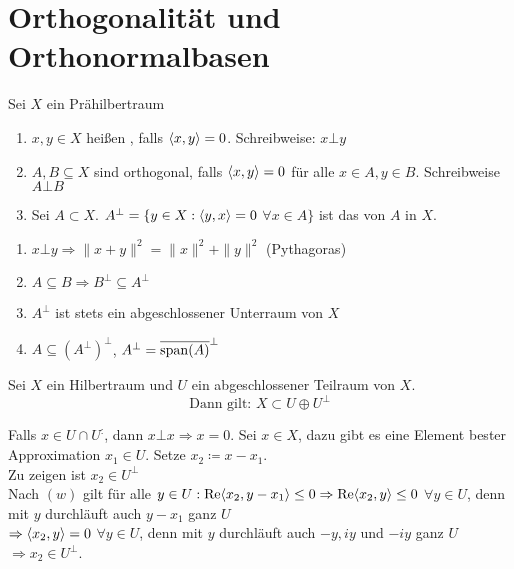 


\section{Orthogonalität und Orthonormalbasen}


\begin{definition}
	Sei $X$ ein Prähilbertraum
	\begin{enumerate}[label=\alph*\upshape)]
		\item $x, y \in X$ hei{\ss}en , falls $\langle x, y \rangle = 0$. Schreibweise: $x \bot y$
		\item $A, B \subseteq X$ sind orthogonal, falls $\langle x, y \rangle = 0$ für alle $x \in A, y \in B$. Schreibweise $A \bot B$
		\item Sei $A \subset X$. $A^{\bot} = \{ y \in X: \langle y, x \rangle = 0$ $\forall x \in A \}$ ist das  von $A$ in $X$.
	\end{enumerate}
\end{definition}


\begin{bemerkung}
	\begin{enumerate}[label=\alph*\upshape)]
		\item $x \bot y \Rightarrow \| x + y \|^{2} = \| x \|^{2} + \| y \|^{2} $ (Pythagoras) 
		\item $A \subseteq B \Rightarrow B^{\bot} \subseteq A^{\bot}$
		\item $A^{\bot}$ ist stets ein abgeschlossener Unterraum von $X$
		\item $A \subseteq \left( A^{\bot} \right)^{\bot}$, $A^{\bot} = \overline{ \operatorname{span}(A) }^{\bot}$
	\end{enumerate}	
\end{bemerkung}


\begin{satz}[Orthogonalzerlegung]  \label{satz:13.6-Orthogonalzerlegung}
	Sei $X$ ein Hilbertraum und $U$ ein abgeschlossener Teilraum von $X$.
		\[ \text{Dann gilt: } X \subset U \oplus U^{\bot} \]
\end{satz}

\begin{beweis}
	Falls $x \in U \cap U^{\colon}$, dann $x \bot x \Rightarrow x = 0$. Sei $x \in X$, dazu gibt es eine Element bester Approximation $x_{1} \in U$. Setze $x_{2} \coloneqq x - x_{1}$. \\
	Zu zeigen ist $x_{2} \in U^{\bot}$ \\
	Nach \hyperref[eq:15.7.5-SkalarproductbestApproximation]{$(w)$} gilt für alle $y \in U: \mathop{\rm Re}\nolimits \langle x_{2}, y - x_{1} \rangle \leq 0 \Rightarrow \mathop{\rm Re}\nolimits \langle x_{2}, y \rangle \leq 0$ $\forall y \in U$, denn mit $y$ durchläuft auch $y - x_{1}$ ganz $U$ \\
	$\Rightarrow \langle x_{2}, y \rangle = 0$ $\forall y \in U$, denn mit $y$ durchläuft auch $-y, iy$ und $-iy$ ganz $U$ $\Rightarrow x_{2} \in U^{\bot}$.
\end{beweis}


